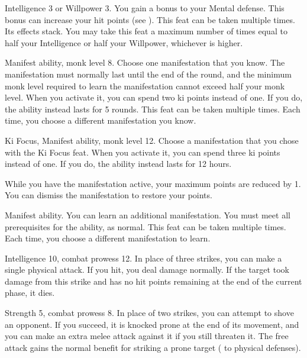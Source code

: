 \featpre Intelligence 3 or Willpower 3.
\featben You gain a  bonus to your Mental defense.
This bonus can increase your hit points (see ).
 This feat can be taken multiple times. Its effects stack.
You may take this feat a maximum number of times equal to half your Intelligence or half your Willpower, whichever is higher.

\featpres Manifest \ki ability, monk level 8.
\featben Choose one \ki manifestation that you know.
The manifestation must normally last until the end of the round, and the minimum monk level required to learn the manifestation cannot exceed half your monk level.
When you activate it, you can spend two ki points instead of one.
If you do, the ability instead lasts for 5 rounds.
 This feat can be taken multiple times.
Each time, you choose a different \ki manifestation you know.

\featpres Ki Focus, Manifest \ki ability, monk level 12.
\featben Choose a \ki manifestation that you chose with the Ki Focus feat.
When you activate it, you can spend three ki points instead of one.
If you do, the ability instead lasts for 12 hours.

While you have the manifestation active, your maximum \ki points are reduced by 1.
You can dismiss the manifestation to restore your \ki points.

\featpre Manifest \ki ability.
\featben You can learn an additional \ki manifestation.
You must meet all prerequisites for the ability, as normal.
 This feat can be taken multiple times.
Each time, you choose a different \ki manifestation to learn.

\featpres Intelligence 10, combat prowess 12.
\featben In place of three strikes, you can make a single physical attack.
If you hit, you deal damage normally.
If the target took damage from this strike and has no hit points remaining at the end of the current phase, it dies.

\featpres Strength 5, combat prowess 8.
\featben In place of two strikes, you can attempt to shove an opponent.
If you succeed, it is knocked prone at the end of its movement, and you can make an extra melee attack against it if you still threaten it.
The free attack gains the normal benefit for striking a prone target ( to physical defenses).

